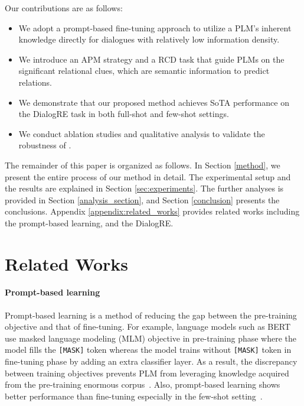 \documentclass[11pt]{article}
\begin{document}
Our contributions are as follows:
\begin{itemize}
\item {We adopt a prompt-based fine-tuning approach to utilize a PLM's inherent knowledge directly for dialogues with relatively low information density.}

\item {We introduce an APM strategy and a RCD task that guide PLMs on the significant relational clues, which are semantic information to predict relations.}

\item {We demonstrate that our proposed method achieves SoTA performance on the DialogRE task in both full-shot and few-shot settings. }

\item {We conduct ablation studies and qualitative analysis to validate the robustness of .}

\end{itemize} 
The remainder of this paper is organized as follows. In Section \ref{method}, we present the entire process of our method in detail. The experimental setup and the results are explained in Section \ref{sec:experiments}. The further analyses is provided in Section \ref{analysis_section}, and Section \ref{conclusion} presents the conclusions. Appendix \ref{appendix:related_works} provides related works including the prompt-based learning, and the DialogRE. 

\section{Related Works\label{appendix:related_works}}
\paragraph{Prompt-based learning}
Prompt-based learning is a method of reducing the gap between the pre-training objective and that of fine-tuning. For example, language models such as BERT ~\citep{devlin-etal-2019-bert} use masked language modeling (MLM) objective in pre-training phase where the model fills the \texttt{[MASK]} token whereas the model trains without \texttt{[MASK]} token in fine-tuning phase by adding an extra classifier layer.
As a result, the discrepancy between training objectives prevents PLM from leveraging knowledge acquired from the pre-training enormous corpus~\citep{chen2021knowprompt}. 
Also, prompt-based learning shows better performance than fine-tuning especially in the few-shot setting~\cite{gao2020making,schick-schutze-2021-exploiting,li2021prefix,liu2021gpt}. 
\end{document}
